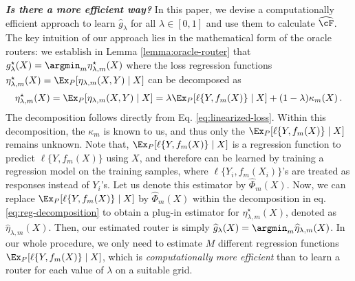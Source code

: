 

\emph{\bf Is there a more efficient way?} In this paper, we devise a computationally efficient approach to learn $\widehat g_\lambda$ for all $\lambda \in [0, 1]$ and use them to calculate $\widehat \cF$. The key intuition of our approach lies in the mathematical form of the oracle routers:  we establish in Lemma \ref{lemma:oracle-router} that  $g_\lambda^\star(X) = \argmin_m \eta_{\lambda, m} ^\star(X)$  where the loss regression functions $\eta_{\lambda, m} ^\star(X) = \Ex _P[\eta_{\lambda, m}(X, Y)\mid X]$ can be decomposed as  
\begin{equation}\label{eq:reg-decomposition}
    \eta_{\lambda, m} ^\star(X) = \Ex _P[\eta_{\lambda, m}(X, Y)\mid X] = \lambda \Ex_P[\ell\{Y , f_m(X)\}\mid X] + (1 - \lambda) \kappa_m(X)\,. 
\end{equation} 
The decomposition follows directly from Eq. \eqref{eq:linearized-loss}. Within this decomposition, the $\kappa_m$ is known to us, and thus only the $\Ex_P[\ell\{Y , f_m(X)\}\mid X]$ remains unknown. Note that, $\Ex_P[\ell\{Y , f_m(X)\}\mid X]$ is a regression function to predict $\ell\{Y , f_m(X)\}$ using $X$, and therefore can be learned by training a regression model on the training samples, where $\ell\{Y_i, f_m(X_i)\}$'s are treated as responses instead of $Y_i$'s. Let us denote this estimator by $\widehat \Phi_m(X)$. Now, we can replace $\Ex_P[\ell\{Y , f_m(X)\}\mid X]$ by $\widehat \Phi_m(X)$ within the decomposition in eq. \eqref{eq:reg-decomposition} to obtain a plug-in estimator for $\eta_{\lambda, m} ^\star(X)$, denoted as $\widehat \eta_{\lambda, m}(X)$. Then, our estimated router is simply $\widehat g_\lambda (X) = \argmin_{m} \widehat \eta_{\lambda, m}(X)$. In our whole procedure, we only need to estimate $M$ different regression functions $\Ex_P[\ell\{Y , f_m(X)\}\mid X]$, which is \emph{computationally more efficient} than to learn a router for each value of $\lambda$ on a suitable grid. 


